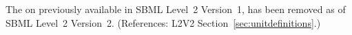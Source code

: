 The   on \Unit previously available in SBML
Level~2 Version~1, has been removed as of SBML Level~2 Version~2.
(References: L2V2 Section~\ref{sec:unitdefinitions}.)
